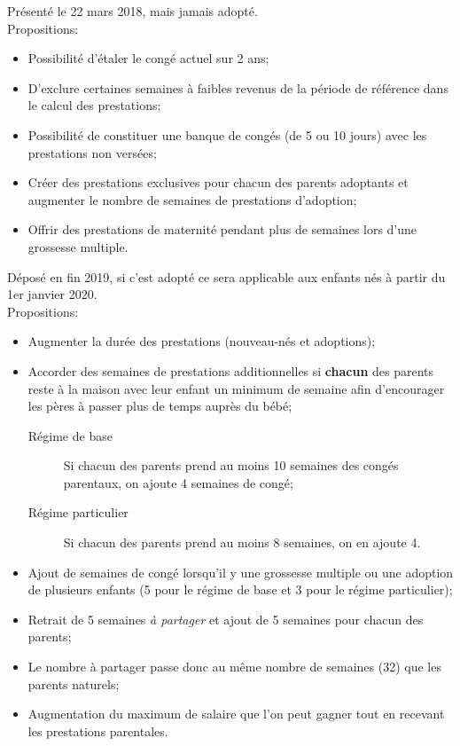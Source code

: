 \documentclass[10pt, french]{article}
\begin{document}
\begin{multicols*}{3}
\begin{definitionNOHFILLsub}
Présenté le 22 mars 2018, mais jamais adopté.\\

Propositions:
\begin{itemize}[leftmargin = *]
	\item	Possibilité d'étaler le congé actuel sur 2 ans;
	\item	D'exclure certaines semaines à faibles revenus de la période de référence dans le calcul des prestations;
	\item	Possibilité de constituer une banque de congés (de 5 ou 10 jours) avec les prestations non versées;
	\item	Créer des prestations exclusives pour chacun des parents adoptants et augmenter le nombre de semaines de prestations d'adoption;
	\item	Offrir des prestations de maternité pendant plus de semaines lors d'une grossesse multiple.
\end{itemize}
\end{definitionNOHFILLsub}

\begin{definitionNOHFILLsub}
Déposé en fin 2019, si c'est adopté ce sera applicable aux enfants nés à partir du 1er janvier 2020.\\

Propositions:
\begin{itemize}[leftmargin = *]
	\item	Augmenter la durée des prestations (nouveau-nés et adoptions);
	\item	Accorder des semaines de prestations additionnelles si \textbf{chacun} des parents reste à la maison avec leur enfant un minimum de semaine afin d'encourager les pères à passer plus de temps auprès du bébé;
		\begin{description}
		\item[Régime de base]	Si chacun des parents prend au moins 10 semaines des congés parentaux, on ajoute 4 semaines de congé;
		\item[Régime particulier]	Si chacun des parents prend au moins 8 semaines, on en ajoute 4.
		\end{description}
	\item	Ajout de semaines de congé lorsqu'il y une grossesse multiple ou une adoption de plusieurs enfants (5 pour le régime de base et 3 pour le régime particulier);
	\item	Retrait de 5 semaines \textit{à partager} et ajout de 5 semaines pour chacun des parents;
	\item	Le nombre à partager passe donc au même nombre de semaines (32) que les parents naturels;
	\item	Augmentation du maximum de salaire que l'on peut gagner tout en recevant les prestations parentales.
\end{itemize}


\end{definitionNOHFILLsub}
\end{multicols*}
\end{document}
